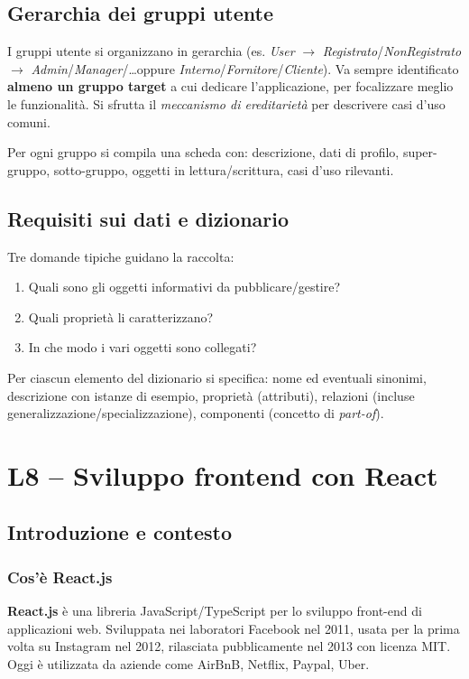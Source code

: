 \documentclass[11pt,a4paper]{article}
\begin{document}
\subsection{Gerarchia dei gruppi utente}

I gruppi utente si organizzano in gerarchia (es. \emph{User} $\to$ \emph{Registrato}/\emph{NonRegistrato} $\to$ \emph{Admin}/\emph{Manager}/\ldots oppure \emph{Interno}/\emph{Fornitore}/\emph{Cliente}). Va sempre identificato \textbf{almeno un gruppo target} a cui dedicare l'applicazione, per focalizzare meglio le funzionalit\`a. Si sfrutta il \emph{meccanismo di ereditariet\`a} per descrivere casi d'uso comuni.

Per ogni gruppo si compila una scheda con: descrizione, dati di profilo, super-gruppo, sotto-gruppo, oggetti in lettura/scrittura, casi d'uso rilevanti.

\subsection{Requisiti sui dati e dizionario}

Tre domande tipiche guidano la raccolta:
\begin{enumerate}[leftmargin=*]
    \item Quali sono gli oggetti informativi da pubblicare/gestire?
    \item Quali propriet\`a li caratterizzano?
    \item In che modo i vari oggetti sono collegati?
\end{enumerate}

Per ciascun elemento del dizionario si specifica: nome ed eventuali sinonimi, descrizione con istanze di esempio, propriet\`a (attributi), relazioni (incluse generalizzazione/specializzazione), componenti (concetto di \emph{part-of}).

\section{L8 -- Sviluppo frontend con React}

\subsection{Introduzione e contesto}

\subsubsection{Cos'\`e React.js}
\textbf{React.js} \`e una libreria JavaScript/TypeScript per lo sviluppo front-end di applicazioni web. Sviluppata nei laboratori Facebook nel 2011, usata per la prima volta su Instagram nel 2012, rilasciata pubblicamente nel 2013 con licenza MIT. Oggi \`e utilizzata da aziende come AirBnB, Netflix, Paypal, Uber.
\end{document}
